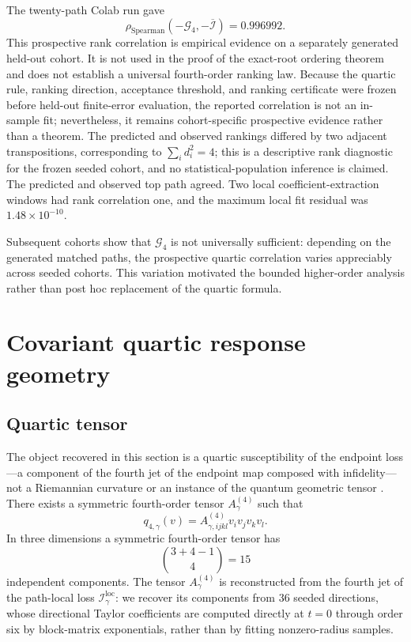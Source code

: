 \documentclass[11pt]{article}
\newcommand{\cI}{\mathcal{I}}
\newcommand{\cG}{\mathcal{G}}
\begin{document}
The twenty-path Colab run gave
\begin{equation}
\rho_{\mathrm{Spearman}}
\left(
-\cG_4,-\overline{\cI}
\right)
=0.996992.
\label{eq:g4rho}
\end{equation}
This prospective rank correlation is empirical evidence on a separately
generated held-out cohort. It is not used in the proof of the exact-root
ordering theorem and does not establish a universal fourth-order ranking
law. Because the quartic rule, ranking direction, acceptance threshold, and
ranking certificate were frozen before held-out finite-error evaluation, the
reported correlation is not an in-sample fit; nevertheless, it remains
cohort-specific prospective evidence rather than a theorem. The predicted
and observed rankings differed by two adjacent transpositions, corresponding
to $\sum_i d_i^2=4$; this is a descriptive rank diagnostic for the frozen
seeded cohort, and no statistical-population inference is claimed. The
predicted and observed top path agreed. Two local coefficient-extraction windows had rank correlation one, and the maximum local fit residual was $1.48\times10^{-10}$.

Subsequent cohorts show that $\cG_4$ is not universally sufficient: depending on the generated matched paths, the prospective quartic correlation varies appreciably across seeded cohorts. This variation motivated the bounded higher-order analysis rather than post hoc replacement of the quartic formula.

\section{Covariant quartic response geometry}

\subsection{Quartic tensor}

The object recovered in this section is a quartic susceptibility of the endpoint loss---a component of the fourth jet of the endpoint map composed with infidelity---not a Riemannian curvature or an instance of the quantum geometric tensor \cite{Provost1980}. There exists a symmetric fourth-order tensor $A^{(4)}_\gamma$ such that
\begin{equation}
q_{4,\gamma}(v)
=
A^{(4)}_{\gamma,ijkl}
v_i v_j v_k v_l.
\label{eq:A4}
\end{equation}
In three dimensions a symmetric fourth-order tensor has
\[
\binom{3+4-1}{4}=15
\]
independent components. The tensor $A^{(4)}_\gamma$ is reconstructed from the fourth jet of the path-local loss $\cI^{\mathrm{loc}}_\gamma$: we recover its components from 36 seeded directions, whose directional Taylor coefficients are computed directly at $t=0$ through order six by block-matrix exponentials, rather than by fitting nonzero-radius samples.
\end{document}
